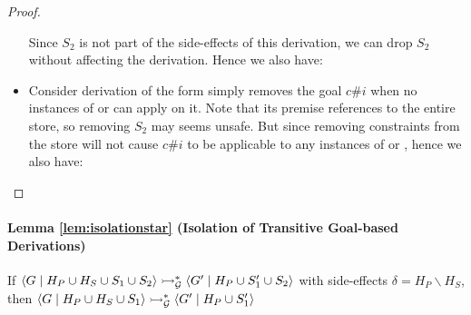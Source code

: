 \documentclass{tlp}
\begin{document}
\begin{proof}
\begin{itemize}
	        \eda
	        Since $S_2$ is not part of the side-effects of this derivation, we can drop $S_2$ 
	        without affecting the derivation. Hence we also have:
	        \eda
	  \item {} Consider derivation of the form
	          \goaltranssf{\{\} \backslash \{\}} 
	        \eda
	         simply removes the goal $c\#i$ when no instances of  or
	         can apply on it. Note that its premise references to the entire store, 
	        so removing $S_2$ may seems unsafe. But since removing constraints from the store will not 
	        cause $c\#i$ to be applicable to any instances of  or ,
	        hence we also have:
	          \goaltranssf{\{\} \backslash \{\}} 
	        \eda
  \end{itemize}
\end{proof}

\paragraph{Lemma \ref{lem:isolationstar} (Isolation of Transitive Goal-based Derivations)}
If $\langle G\mid H_P \cup H_S \cup S_1 \cup S_2 \rangle 
    \rightarrowtail^*_{\cal G}
    \langle G'\mid H_P \cup S_1' \cup S_2 \rangle$
with side-effects $\delta = H_P \backslash H_S$, 
then $\langle G\mid H_P \cup H_S \cup S_1 \rangle 
      \rightarrowtail^*_{\cal G} 
      \langle G'\mid H_P \cup S_1' \rangle$
\end{document}

